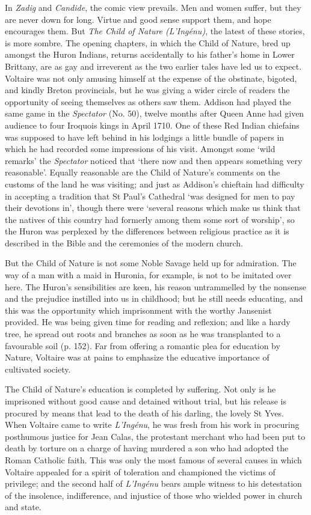 \documentclass{article}
\begin{document}
\begin{center}
In \textit{Zadig} and \textit{Candide}, the comic view prevails. Men and women 
suffer, but they are never down for long. Virtue and good sense support them, and 
hope encourages them. But \textit{The Child of Nature (L'Ingénu)}, the latest 
of these stories, is more sombre. The opening chapters, in which the Child of Nature, 
bred up amongst the Huron Indians, returns accidentally to his father's home in 
Lower Brittany, are as gay and irreverent as the two earlier tales have led us 
to expect. Voltaire was not only amusing himself at the expense of the obstinate, 
bigoted, and kindly Breton provincials, but he was giving a wider circle of readers 
the opportunity of seeing themselves as others saw them. Addison had played the 
same game in the \textit{Spectator} (No. 50), twelve months after Queen Anne had 
given audience to four Iroquois kings in April 1710. One of these Red Indian chiefains 
was supposed to have left behind in his lodgings a little bundle of papers in which 
he had recorded some impressions of his visit. Amongst some `wild remarks' the 
\textit{Spectator} noticed that `there now and then appears something very reasonable'. 
Equally reasonable are the Child of Nature's comments on the customs of the land 
he was visiting; and just as Addison's chieftain had difficulty in accepting a 
tradition that St Paul's Cathedral `was designed for men to pay their devotions 
in', though there were `several reasons which make us think that the natives of 
this country had formerly among them some sort of worship', so the Huron was perplexed 
by the differences between religious practice as it is described in the Bible and 
the ceremonies of the modern church. 

But the Child of Nature is not some Noble Savage held up for admiration. The way 
of a man with a maid in Huronia, for example, is not to be imitated over here. 
The Huron's sensibilities are keen, his reason untrammelled by the nonsense and 
the prejudice instilled into us in childhood; but he still needs educating, and 
this was the opportunity which imprisonment with the worthy Jansenist provided. 
He was being given time for reading and reflexion; and like a hardy tree, he spread 
out roots and branches as soon as he was transplanted to a favourable soil (p. 
152). Far from offering a romantic plea for education by Nature, Voltaire was at 
pains to emphasize the educative importance of cultivated society. 

The Child of Nature's education is completed by suffering. Not only is he imprisoned 
without good cause and detained without trial, but his release is procured by means 
that lead to the death of his darling, the lovely St Yves. When Voltaire came to 
write \textit{L'Ingénu}, he was fresh from his work in procuring posthumous justice 
for Jean Calas, the protestant merchant who had been put to death by torture on 
a charge of having murdered a son who had adopted the Roman Catholic faith. This 
was only the most famous of several causes in which Voltaire appealed for a spirit 
of toleration and championed the victims of privilege; and the second half of \textit{L'Ingénu} 
bears ample witness to his detestation of the insolence, indifference, and injustice 
of those who wielded power in church and state. 


\end{center}
\end{document}
